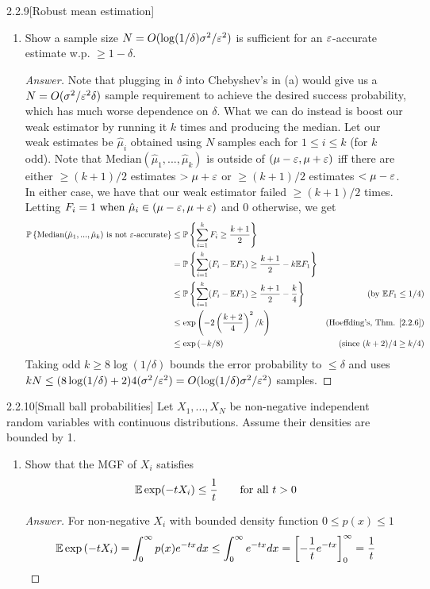 {\begin{ex}{2.2.9}[Robust mean estimation]
\begin{enumerate}[label=(\alph*)]
\item Show a sample size $N = O(\log(1/\delta)\sigma^2/\varepsilon^2)$ is sufficient for an $\varepsilon$-accurate estimate w.p. $\geq 1-\delta$.
\begin{proof}[Answer]
Note that plugging in $\delta$ into Chebyshev's in (a) would give us a $N = O(\sigma^2/\varepsilon^2\delta)$ sample requirement to achieve the desired success probability, which has much worse dependence on $\delta$. What we can do instead is boost our weak estimator by running it $k$ times and producing the median. Let our weak estimates be $\hat{\mu}_i$ obtained using $N$ samples each for $1 \leq i \leq k$ (for $k$ odd). Note that $\text{Median}(\hat{\mu}_1,...,\hat{\mu}_k)$ is outside of $(\mu -\varepsilon, \mu +\varepsilon)$ iff there are either $\geq (k+1)/2$ estimates $> \mu +\varepsilon$ or $\geq (k+1)/2$ estimates $< \mu -\varepsilon$. In either case, we have that our weak estimator failed $\geq (k+1)/2$ times. Letting $F_i = 1 \text{ when $\hat{\mu}_i \in (\mu-\varepsilon, \mu+\varepsilon)$}$ and 0 otherwise, we get
\begin{align*}
    \mathbb{P} \left\{\text{Median}(\hat{\mu}_1,...,\hat{\mu}_k) \text{ is not $\varepsilon$-accurate}\right\} &\leq \mathbb{P} \left\{\sum_{i=1}^k F_i \geq \frac {k+1}2\right\} \\
    &= \mathbb{P} \left\{\sum_{i=1}^k (F_i - \mathbb{E} F_1) \geq \frac {k+1}2 - k\mathbb{E} F_1\right\} \\
    &\leq \mathbb{P} \left\{\sum_{i=1}^k (F_i - \mathbb{E} F_1) \geq \frac {k+1}2 - \frac k 4\right\} &\text{(by $\mathbb{E} F_1 \leq 1/4$)} \\
    &\leq \exp\left(-2\left(\frac {k+2} 4\right)^2/k\right) &\text{(Hoeffding's, Thm. \ref{2.2.6})} \\
    &\leq \exp\left(-k/8\right) &\text{(since $(k+2)/4 \geq k/4$)}
\end{align*}
Taking odd $k \geq 8\log (1/\delta)$ bounds the error probability to $\leq \delta$ and uses $kN \leq  (8\log (1/\delta) +2) 4(\sigma^2/\varepsilon^2) = O(\log(1/\delta)\sigma^2/\varepsilon^2)$ samples.

\end{proof}
\end{enumerate}
\end{ex}


\begin{ex}{2.2.10}[Small ball probabilities]\label{2.2.10}
Let $X_1,...,X_N$ be non-negative independent random variables with continuous distributions. Assume their densities are bounded by 1.
\begin{enumerate}[label=(\alph*)]
\item Show that the MGF of $X_i$ satisfies
\begin{align*}
    \mathbb{E} \exp(-tX_i) \leq \frac 1 t \qquad{\text{for all $t > 0$}}
\end{align*}
\begin{proof}[Answer]
For non-negative $X_i$ with bounded density function $0 \leq p(x) \leq 1$
\begin{align*}
    \mathbb{E} \exp\left(-tX_i\right) = \int^\infty_0  p(x) e^{-tx} dx \leq \int_0^\infty e^{-tx} dx = \left[-\frac 1 t e^{-tx}\right]^\infty_0 = \frac 1 t
\end{align*}
\end{proof}


\end{enumerate}
\end{ex}}
